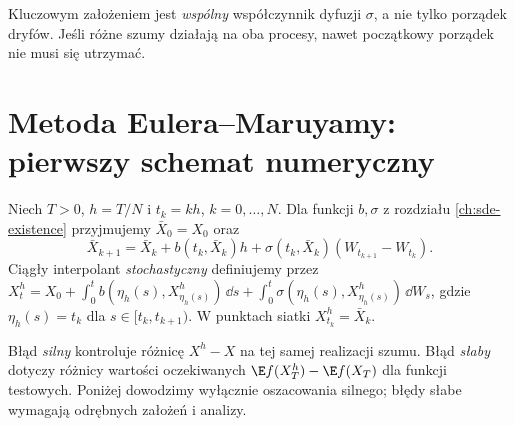 \begin{uwaga}
Kluczowym założeniem jest \emph{wspólny} współczynnik
dyfuzji $\sigma$, a nie tylko porządek dryfów.
Jeśli różne szumy działają na oba procesy, nawet
początkowy porządek nie musi się utrzymać.
\end{uwaga}

\section{Metoda Eulera--Maruyamy: pierwszy schemat numeryczny}
\begin{definicja}
\label{def:em}
Niech $T>0$, $h=T/N$ i $t_k=kh$, $k=0,\ldots,N$.
Dla funkcji $b,\sigma$ z rozdziału
\ref{ch:sde-existence} przyjmujemy
$\bar X_0=X_0$ oraz
\[
\bar X_{k+1}=\bar X_k+b(t_k,\bar X_k)h
+\sigma(t_k,\bar X_k)(W_{t_{k+1}}-W_{t_k}).
\tag{6.11}\label{eq:em}
\]
Ciągły interpolant \emph{stochastyczny} definiujemy
przez $X_t^h=X_0+\int_0^t b(\eta_h(s),X^h_{\eta_h(s)})\,\dd s
+\int_0^t\sigma(\eta_h(s),X^h_{\eta_h(s)})\,\dd W_s$,
gdzie $\eta_h(s)=t_k$ dla $s\in[t_k,t_{k+1})$.
W punktach siatki $X_{t_k}^h=\bar X_k$.
\end{definicja}

\begin{uwaga}
Błąd \emph{silny} kontroluje różnicę $X^h-X$
na tej samej realizacji szumu. Błąd \emph{słaby}
dotyczy różnicy wartości oczekiwanych
$\E f(X_T^h)-\E f(X_T)$ dla funkcji testowych.
Poniżej dowodzimy wyłącznie oszacowania silnego;
błędy słabe wymagają odrębnych założeń i analizy.
\end{uwaga}

